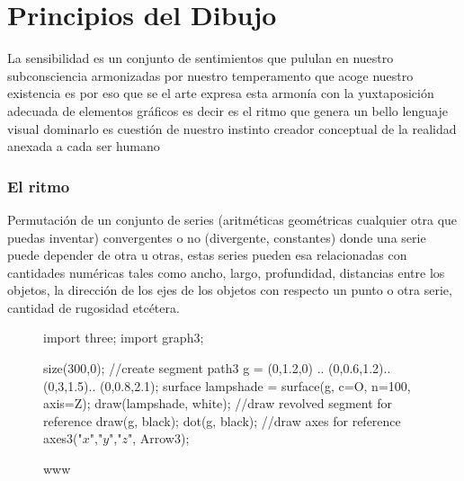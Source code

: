 \chapter{Principios del Dibujo}

La sensibilidad es un conjunto de sentimientos que pululan en nuestro subconsciencia armonizadas por nuestro temperamento que acoge nuestro existencia es por eso que se el arte expresa esta armonía con la yuxtaposición adecuada de elementos gráficos es decir es el ritmo que genera un bello lenguaje visual dominarlo es cuestión de nuestro instinto creador conceptual de la realidad anexada a cada ser humano
\subsection{El ritmo} Permutación de un conjunto de series (aritméticas geométricas cualquier otra que puedas inventar) convergentes o no (divergente, constantes) donde una serie puede depender de otra u otras, estas series pueden esa relacionadas con cantidades numéricas tales como ancho, largo, profundidad, distancias entre los objetos, la dirección de los ejes de los objetos con respecto un punto o otra serie, cantidad de rugosidad etcétera.


\begin{figure}
	\begin{asy}
	import three;
	import graph3;

	size(300,0);
	//create segment
	path3 g = (0,1.2,0) ..
	(0,0.6,1.2)..
	(0,3,1.5)..
	(0,0.8,2.1);
	surface lampshade =
	surface(g, c=O, n=100, axis=Z);
	draw(lampshade, white);
	//draw revolved segment for reference
	draw(g, black);
	dot(g, black);
	//draw axes for reference
	axes3("$x$","$y$","$z$", Arrow3);
	\end{asy}

	\caption{www}
\end{figure}




